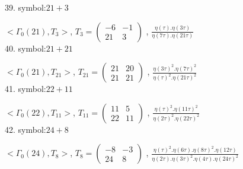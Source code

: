 39. symbol:$ 21+3 $

$ < \Gamma_0 ( 21 ), T_3 >  $,
$
T_3 = 
\left(
\begin{array}{cc}
-6 & -1 \\
21 & 3
\end{array}
\right)
$
, {$ \frac{\eta(\tau) . \eta(3\tau)}{\eta(7\tau) . \eta(21\tau)} $}
\\

40. symbol:$ 21+21 $

$ < \Gamma_0 ( 21 ), T_{21} >  $,
$
T_{21} = 
\left(
\begin{array}{cc}
21 & 20 \\
21 & 21
\end{array}
\right)
$
, {$ \frac{\eta(3\tau)^2 . \eta(7\tau)^2}{\eta(\tau)^2 . \eta(21\tau)^2} $}
\\

41. symbol:$ 22+11 $

$ < \Gamma_0 ( 22 ), T_{11} >  $,
$
T_{11} = 
\left(
\begin{array}{cc}
11 & 5 \\
22 & 11
\end{array}
\right)
$
, {$ \frac{\eta(\tau)^2 . \eta(11\tau)^2}{\eta(2\tau)^2 . \eta(22\tau)^2} $}
\\

42. symbol:$ 24+8 $

$ < \Gamma_0 ( 24 ), T_8 >  $,
$
T_8 = 
\left(
\begin{array}{cc}
-8 & -3 \\
24 & 8
\end{array}
\right)
$
, {$ \frac{\eta(\tau)^2 . \eta(6\tau) .\eta(8\tau)^2 .\eta(12\tau)}{\eta(2\tau) . \eta(3\tau)^2 .\eta(4\tau) .\eta(24\tau)^2} $}
\\